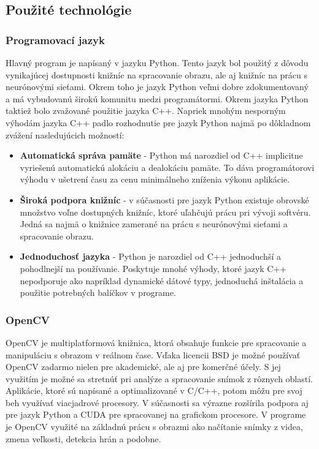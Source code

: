 \documentclass[slovak,master,dept460,male,cpp,cpdeclaration]{diploma}
\begin{document}
\newpage
\subsection{Použité technológie}

\subsubsection*{Programovací jazyk}
Hlavný program je napísaný v jazyku Python. Tento jazyk bol použitý z dôvodu vynikajúcej dostupnosti knižníc na spracovanie obrazu, ale aj knižníc na prácu s neurónovými sieťami. Okrem toho je jazyk Python veľmi dobre zdokumentovaný a má vybudovanú širokú komunitu medzi programátormi. Okrem jazyka Python taktiež bolo zvažované použitie jazyka C++.  Napriek mnohým nesporným výhodám jazyka C++ padlo rozhodnutie pre jazyk Python najmä po dôkladnom zvážení nasledujúcich možností:
\begin{itemize}
\item \textbf{Automatická správa pamäte} - Python má narozdiel od C++  implicitne  vyriešenú automatickú alokáciu a dealokáciu pamäte. To dáva programátorovi výhodu v ušetrení času za cenu minimálneho zníženia výkonu aplikácie.
\item \textbf{Široká podpora knižníc} - v súčasnosti pre jazyk Python existuje obrovské množstvo voľne dostupných knižníc, ktoré uľahčujú prácu pri vývoji softvéru. Jedná sa najmä o knižnice zamerané na prácu s neurónovými sieťami a spracovanie obrazu.
\item \textbf{Jednoduchosť jazyka} - Python je narozdiel od C++ jednoduchší a pohodlnejší  na používanie. Poskytuje mnohé výhody, ktoré jazyk C++ nepodporuje ako napríklad dynamické dátové typy, jednoduchá inštalácia a použitie potrebných balíčkov v programe.
\end{itemize}

\subsubsection*{OpenCV}
OpenCV je multiplatformová knižnica, ktorá obsahuje funkcie pre spracovanie a manipuláciu s obrazom v reálnom čase. Vďaka licencii BSD je možné používať OpenCV zadarmo  nielen pre akademické, ale aj pre komerčné účely. S jej využitím je možné sa stretnúť pri analýze a spracovanie snímok z rôznych oblastí. Aplikácie, ktoré sú napísané a optimalizované v C/C++, potom môžu pre svoj beh využívať viacjadrové procesory. V súčasnosti sa výrazne rozšírila podpora aj pre jazyk Python a CUDA pre spracovanej na grafickom procesore. V programe je OpenCV využité  na základnú prácu s obrazmi ako načítanie snímky z videa, zmena veľkosti, detekcia hrán a podobne.
\end{document}
